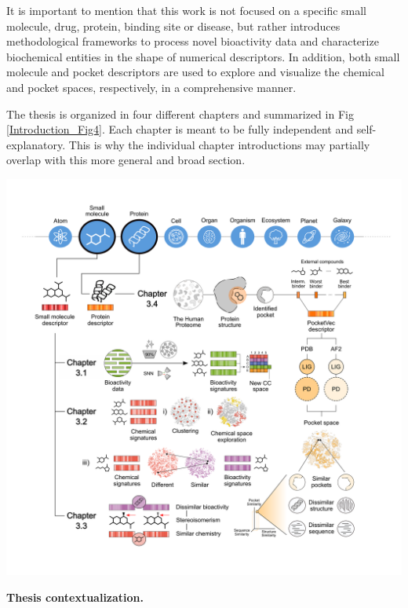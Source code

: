 It is important to mention that this work is not focused on a specific small molecule, drug, protein, binding site or disease, but rather introduces methodological frameworks to process novel bioactivity data and characterize biochemical entities in the shape of numerical descriptors. In addition, both small molecule and pocket descriptors are used to explore and visualize the chemical and pocket spaces, respectively, in a comprehensive manner. 

The thesis is organized in four different chapters and summarized in Fig \ref{Introduction_Fig4}. Each chapter is meant to be fully independent and self-explanatory. This is why the individual chapter introductions may partially overlap with this more general and broad section. 

\begin{Figure_modified}
  \centering
  \includegraphics[width=\linewidth]{figures/Introduction/ThesisScheme_v3.png}
  \caption{
    \textbf{Thesis contextualization.} 
}
\end{Figure_modified}
